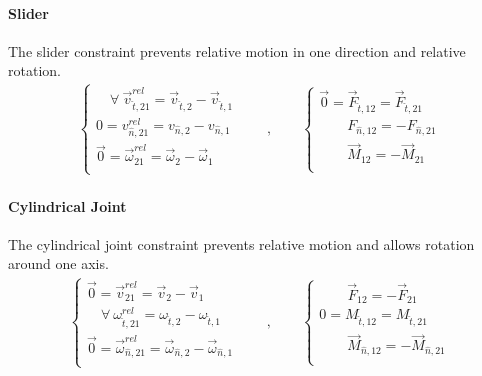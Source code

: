 \documentclass[letterpaper,10pt,english]{jupyterBook}
\begin{document}
\paragraph{Slider}
\label{\detokenize{ch/actions-reactions:slider}}
\sphinxAtStartPar
The slider constraint prevents relative motion in one direction and relative rotation.
\begin{equation*}
\begin{split}
\begin{cases}
  \quad \forall \ \vec{v}^{rel}_{\hat{t},21}     = \vec{v}_{\hat{t},2}     - \vec{v}_{\hat{t},1} \\
          0  = v^{rel}_{\hat{n},21}     = v_{\hat{n},2}     - v_{\hat{n},1} \\
  \vec{0} = \vec{\omega}^{rel}_{21} = \vec{\omega}_{2} - \vec{\omega}_{1} \\
\end{cases}
\qquad , \qquad
\begin{cases}
  \vec{0} = \vec{F}_{\hat{t},12} = \vec{F}_{\hat{t},21} \\
  \qquad F_{\hat{n},12} = - F_{\hat{n},21} \\
  \qquad \vec{M}_{12} = - \vec{M}_{21} \\
\end{cases}
\end{split}
\end{equation*}

\paragraph{Cylindrical Joint}
\label{\detokenize{ch/actions-reactions:cylindrical-joint}}
\sphinxAtStartPar
The cylindrical joint constraint prevents relative motion and allows rotation around one axis.
\begin{equation*}
\begin{split}
\begin{cases}
  \vec{0} = \vec{v}^{rel}_{21}     = \vec{v}_{2}     - \vec{v}_{1} \\
  \quad \forall \ \omega^{rel}_{\hat{t},21} = \omega_{\hat{t},2} - \omega_{\hat{t},1} \\
  \vec{0} = \vec{\omega}^{rel}_{\hat{n},21} = \vec{\omega}_{\hat{n},2} - \vec{\omega}_{\hat{n},1} \\
\end{cases}
\qquad , \qquad
\begin{cases}
  \qquad \vec{F}_{12} = - \vec{F}_{21} \\
  0 =  M_{\hat{t},12} = M_{\hat{t},21} \\
  \qquad \vec{M}_{\hat{n},12} = - \vec{M}_{\hat{n},21} \\
\end{cases}
\end{split}
\end{equation*}
\end{document}
